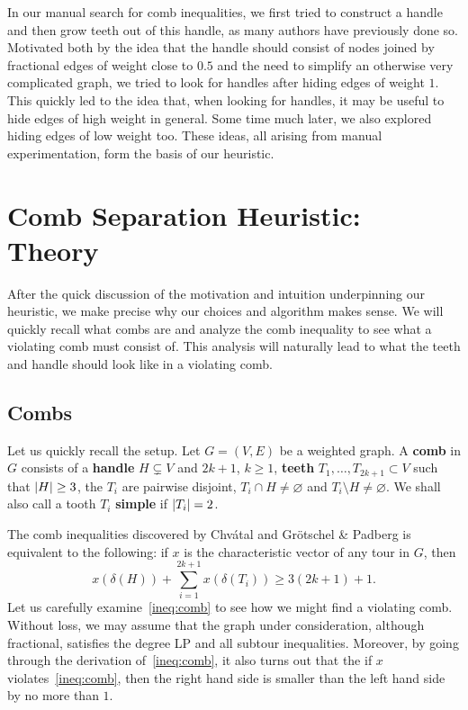 \documentclass[11pt, letterpaper]{amsart}
\theoremstyle{plain}
\theoremstyle{definition}
\theoremstyle{remark}
\DeclarePairedDelimiter{\abs}{\lvert}{\rvert}
\begin{document}
In our manual search for comb inequalities, we first tried to construct a
handle and then grow teeth out of this handle, as many authors have previously
done so.  Motivated both by the idea that the handle should consist of nodes
joined by fractional edges of weight close to $0.5$ and the need to simplify an
otherwise very complicated graph, we tried to look for handles after hiding
edges of weight $1$. This quickly led to the idea that, when looking for
handles, it may be useful to hide edges of high weight in general. Some time
much later, we also explored hiding edges of low weight too. These ideas,
all arising from manual experimentation, form the basis of our heuristic.

\section{Comb Separation Heuristic: Theory}
After the quick discussion of the motivation and intuition underpinning our
heuristic, we make precise why our choices and algorithm makes sense. We will
quickly recall what combs are and analyze the comb inequality to see what a
violating comb must consist of. This analysis will naturally lead to what the
teeth and handle should look like in a violating comb.

\subsection{Combs}
Let us quickly recall the setup. Let $G = (V,E)$ be a weighted graph. A
\textbf{comb} in $G$ consists of a \textbf{handle} $H \subsetneq V$ and $2k+1$,
$k \geq 1$, \textbf{teeth} $T_1,\ldots,T_{2k+1} \subset V$ such that $\abs{H}
\geq 3$, the $T_i$ are pairwise disjoint, $T_i \cap H \neq \varnothing$ and
$T_i \setminus H \neq \varnothing$. We shall also call a tooth $T_i$
\textbf{simple} if $\abs{T_i} = 2$.

The comb inequalities discovered by Chv\'atal and Gr\"otschel \& Padberg is
equivalent to the following: if $x$ is the characteristic vector of any tour in
$G$, then
\begin{equation}\label{ineq:comb}
  x(\delta(H)) + \sum^{2k+1}_{i = 1}x(\delta(T_i)) \geq 3(2k+1) + 1.
\end{equation}
Let us carefully examine~\eqref{ineq:comb} to see how we might find a violating comb.
Without loss, we may assume that the graph under consideration, although
fractional, satisfies the degree LP and all subtour inequalities. Moreover, by
going through the derivation of~\eqref{ineq:comb}, it also turns out that the if $x$
violates~\eqref{ineq:comb}, then the right hand side is smaller than the left hand side by
no more than $1$.
\end{document}
